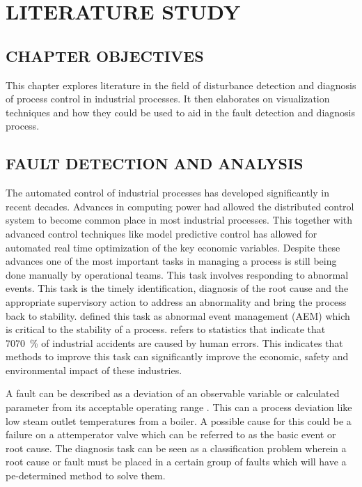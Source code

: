 
\chapter{LITERATURE STUDY}

\section{CHAPTER OBJECTIVES}

This chapter explores literature in the field of disturbance detection and diagnosis of process control in industrial processes. It then elaborates on visualization techniques and how they could be used to aid in the fault detection and diagnosis process.

\section{FAULT DETECTION AND ANALYSIS}

The automated control of industrial processes has developed significantly in recent decades. Advances in computing power had allowed the distributed control system to become common place in most industrial processes. This together with advanced control techniques like model predictive control has allowed for automated real time optimization of the key economic variables. Despite these advances one of the most important tasks in managing a process is still being done manually by operational teams. This task involves responding to abnormal events. This task is the timely identification, diagnosis of the root cause and the appropriate supervisory action to address an abnormality and bring the process back to stability. \cite{venkatasubramanian2003review} defined this task as abnormal event management (AEM) which is critical to the stability of a process. \cite{venkatasubramanian2003review} refers to statistics that indicate that 70\SI{70}{\percent} of industrial accidents are caused by human errors. This indicates that methods to improve this task can significantly improve the economic, safety and environmental impact of these industries.

A fault can be described as a deviation of an observable variable or calculated parameter from its acceptable operating range \cite{venkatasubramanian2003review}. This can a process deviation like low steam outlet temperatures from a boiler. A possible cause for this could be a failure on a attemperator valve which can be referred to as the basic event or root cause. The diagnosis task can be seen as a classification problem wherein a root cause or fault must be placed in a certain group of faults which will have a pe-determined method to solve them.

